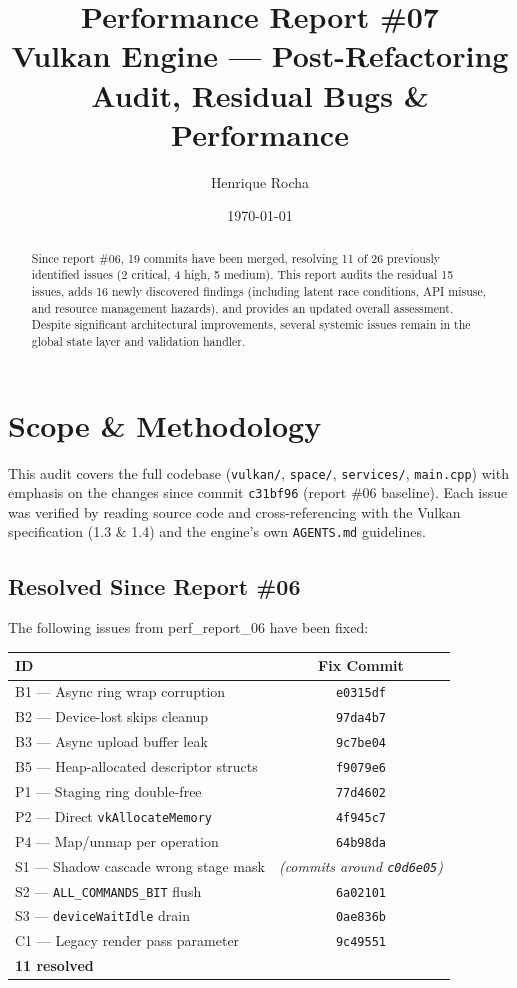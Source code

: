 \documentclass[a4paper,12pt]{article}
\title{\textbf{Performance Report \#07}\\[4pt]
\large Vulkan Engine — Post-Refactoring Audit, Residual Bugs \& Performance}
\author{Henrique Rocha}
\date{\today}
\begin{document}
\maketitle

\begin{abstract}
Since report \#06, 19 commits have been merged, resolving 11 of 26 previously
identified issues (2 critical, 4 high, 5 medium). This report audits the residual
15 issues, adds 16 newly discovered findings (including latent race conditions,
API misuse, and resource management hazards), and provides an updated overall
assessment. Despite significant architectural improvements, several systemic
issues remain in the global state layer and validation handler.
\end{abstract}

\tableofcontents
\newpage

\section{Scope \& Methodology}

This audit covers the full codebase (\texttt{vulkan/}, \texttt{space/},
\texttt{services/}, \texttt{main.cpp}) with emphasis on the changes since
commit \texttt{c31bf96} (report \#06 baseline). Each issue was verified by
reading source code and cross-referencing with the Vulkan specification (1.3
\& 1.4) and the engine's own \texttt{AGENTS.md} guidelines.

\subsection*{Resolved Since Report \#06}

The following issues from perf\_report\_06 have been fixed:

\begin{center}
\begin{tabular}{lc}
\toprule
\textbf{ID} & \textbf{Fix Commit} \\
\midrule
B1 — Async ring wrap corruption & \texttt{e0315df} \\
B2 — Device-lost skips cleanup & \texttt{97da4b7} \\
B3 — Async upload buffer leak & \texttt{9c7be04} \\
B5 — Heap-allocated descriptor structs & \texttt{f9079e6} \\
P1 — Staging ring double-free & \texttt{77d4602} \\
P2 — Direct \texttt{vkAllocateMemory} & \texttt{4f945c7} \\
P4 — Map/unmap per operation & \texttt{64b98da} \\
S1 — Shadow cascade wrong stage mask & \textit{(commits around \texttt{c0d6e05})} \\
S2 — \texttt{ALL\_COMMANDS\_BIT} flush & \texttt{6a02101} \\
S3 — \texttt{deviceWaitIdle} drain & \texttt{0ae836b} \\
C1 — Legacy render pass parameter & \texttt{9c49551} \\
\midrule
\textbf{11 resolved} & \\
\bottomrule
\end{tabular}
\end{center}
\end{document}
